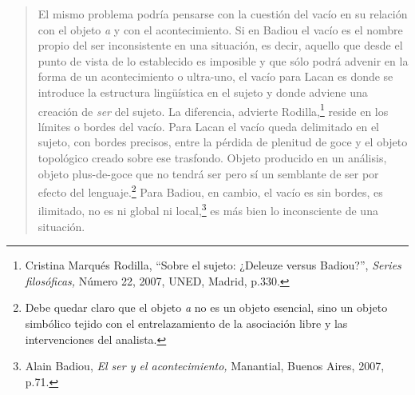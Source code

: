 \begin{quote}
El mismo problema podría pensarse con la cuestión del vacío en su relación con el objeto \emph{a} y con el acontecimiento. Si en Badiou el vacío es el nombre propio del ser inconsistente en una situación, es decir, aquello que desde el punto de vista de lo establecido es imposible y que sólo podrá advenir en la forma de un acontecimiento o ultra-uno, el vacío para Lacan es donde se introduce la estructura lingüística en el sujeto y donde adviene una creación de \emph{ser} del sujeto. La diferencia, advierte Rodilla,\footnote{Cristina Marqués Rodilla, \enquote{Sobre el sujeto: ¿Deleuze versus Badiou?}, \emph{Series filosóficas,} Número 22, 2007, UNED, Madrid, p.330.} reside en los límites o bordes del vacío. Para Lacan el vacío queda delimitado en el sujeto, con bordes precisos, entre la pérdida de plenitud de goce  y el objeto topológico creado sobre ese trasfondo. Objeto producido en un análisis, objeto plus-de-goce que no tendrá ser pero sí un semblante de ser por efecto del lenguaje.\footnote{Debe quedar claro que el objeto \emph{a} no es un objeto esencial, sino un objeto simbólico tejido con el entrelazamiento de la asociación libre y las intervenciones del analista.} Para Badiou, en cambio, el vacío es sin bordes, es ilimitado, no es ni global ni local,\footnote{Alain Badiou, \emph{El ser y el acontecimiento,} Manantial, Buenos Aires, 2007, p.71.} es más bien lo inconsciente de una situación.


\end{quote}
